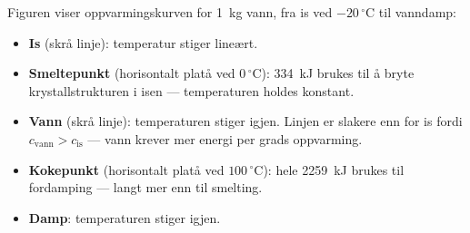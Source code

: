\medskip
\noindent
\begin{minipage}[t]{0.52\linewidth}
\vspace{0pt}
Figuren viser oppvarmingskurven for \SI{1}{\kilo\gram} vann, fra is ved $-20\,^\circ$C til vanndamp:

\begin{itemize}
  \item \textbf{Is} (skrå linje): temperatur stiger lineært.
  \item \textbf{Smeltepunkt} (horisontalt platå ved $0\,^\circ$C): \SI{334}{\kilo\joule} brukes til å bryte krystallstrukturen i isen — temperaturen holdes konstant.
  \item \textbf{Vann} (skrå linje): temperaturen stiger igjen. Linjen er slakere enn for is fordi $c_{\text{vann}} > c_{\text{is}}$ — vann krever mer energi per grads oppvarming.
  \item \textbf{Kokepunkt} (horisontalt platå ved $100\,^\circ$C): hele \SI{2259}{\kilo\joule} brukes til fordamping — langt mer enn til smelting.
  \item \textbf{Damp}: temperaturen stiger igjen.
\end{itemize}
\end{minipage}%
\hfill
